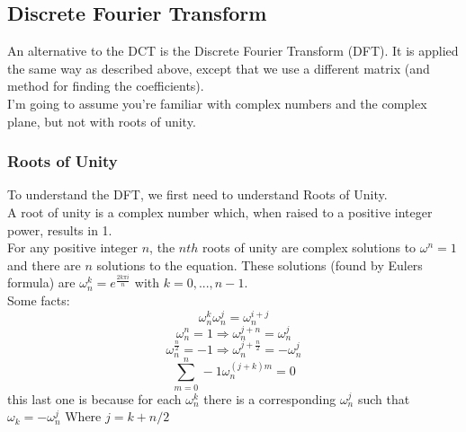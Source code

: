 \documentclass[12pt]{article}
\theoremstyle{definition}
\begin{document}
\subsection{Discrete Fourier Transform}
An alternative to the DCT is the Discrete Fourier Transform (DFT). It is applied the same way as described above, except that we use a different matrix (and method for finding the coefficients).
\\ \linebreak
I'm going to assume you're familiar with complex numbers and the complex plane, but not with roots of unity. 


\subsubsection{Roots of Unity}
To understand the DFT, we first need to understand Roots of Unity.
\\ \linebreak
A root of unity is a complex number which, when raised to a positive integer power, results in 1. 
\\ \linebreak
For any positive integer $n$, the $nth$ roots of unity are complex solutions to $\omega^n = 1$ and there are $n$ solutions to the equation. These solutions (found by Eulers formula) are $\omega^k_n = e^{\frac{2k\pi i}{n}}$
with $k = 0, ..., n-1$.
\\ \linebreak
Some facts:\\
$$\omega^k_n \omega^j_n = \omega^{i+j}_n$$
$$\omega^n_n = 1 \Rightarrow \omega^{j+n}_n = \omega^j_n$$
$$\omega^{\frac{n}{2}}_n = -1 \Rightarrow \omega^{j+\frac{n}{2}}_n = -\omega^j_n$$
$$\sum_{m=0}^n-1 \omega_n^{(j+k)m} = 0$$
this last one is because for each $\omega_n^k$ there is a corresponding $\omega_n^j$ such that $\omega_k = -\omega_n^j$ Where $j = k + n/2$
\\ \linebreak
\end{document}
